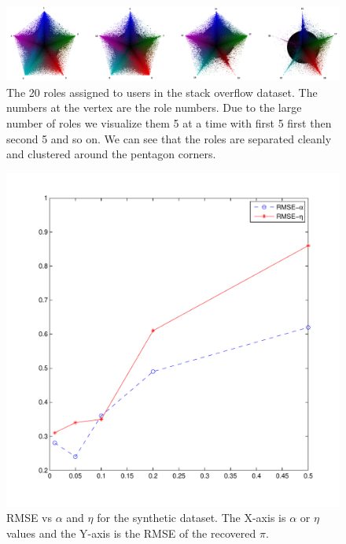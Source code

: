 \documentclass{sig-alternate}
\begin{document}
\begin{figure}
\centering
  \includegraphics[width=1\linewidth]{piSOAnnotated.png}
\caption{The 20 roles assigned to users in the stack overflow
dataset. The numbers at the vertex are the role numbers. Due to the large
number of roles we visualize them 5 at a time with first 5 first then second
5 and so on.
We can see that the roles are separated cleanly and clustered around the
pentagon corners.}
\label{fig:SOclusters}
\end{figure}

\begin{figure}
\centering
  \includegraphics[width=0.7\linewidth]{synth.pdf}
\caption{RMSE vs $\alpha$ and $\eta$ for the synthetic dataset. The X-axis is
$\alpha$ or $\eta$ values and the Y-axis is the RMSE of the recovered $\pi$. }
\label{fig:syntheticRMSE}
\end{figure}
 
\end{document}
